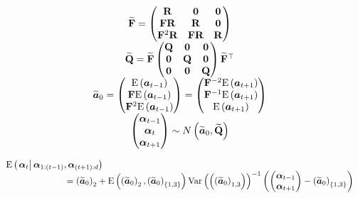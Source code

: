 





\begin{equation}\begin{array}{c}
	\matt{F} = \begin{pmatrix}
		\mat{R} & \mat{0} & \mat{0} \\
		\mat{F}\mat{R} &\mat{R} & \mat{0} \\
		\mat{F}^2\mat{R} & \mat{F}\mat{R} & \mat{R}
	\end{pmatrix} \\
%
	\matt{Q} = \matt{F}\begin{pmatrix}
		\mat{Q} & \mat{0} & \mat{0} \\
		\mat{0} & \mat{Q} &  \mat{0} \\
		\mat{0} & \mat{0} & \mat{Q}
	\end{pmatrix}\matt{F}^\top \\
%
	\vect{a}_0 = \begin{pmatrix}
		\expec{\vec{a}_{t - 1}} \\ \mat{F}\expec{\vec{a}_{t - 1}} \\ \mat{F}^{2}\expec{\vec{a}_{t - 1}}
	\end{pmatrix} = 
	\begin{pmatrix}
		\mat{F}^{-2}\expec{\vec{a}_{t + 1}} \\ \mat{F}^{-1}\expec{\vec{a}_{t + 1}} \\ \expec{\vec{a}_{t + 1}}
	\end{pmatrix} \\
%
	\begin{pmatrix}
		\vec{\alpha}_{t-1} \\ \vec{\alpha}_{t} \\ \vec{\alpha}_{t+1}
	\end{pmatrix} \sim \normal{\vect{a}_0}{\matt{Q}}
\end{array}\end{equation}

\begin{equation}\begin{array}{cl}
	\expecC{\vec{\alpha}_t}{\vec{\alpha}_{1:(t - 1)}, \vec{\alpha}_{(t + 1):d}} \hspace{-50pt}& \\ 
%
 	& =  \Lparen{\vect{a}_0}_2 + \covp{\Lparen{\vect{a}_0}_2, \Lparen{\vect{a}_0}_{\{1, 3\}}} %
 		\varp{\Lparen{\Lparen{\vect{a}_0}_{1, 3}}}^{-1} %
 		\Lparen{\begin{pmatrix} \vec{\alpha}_{t - 1} \\ \vec{\alpha}_{t + 1}\end{pmatrix} - \Lparen{\vect{a}_0}_{\{1, 3\}}}
\end{array}\end{equation}











